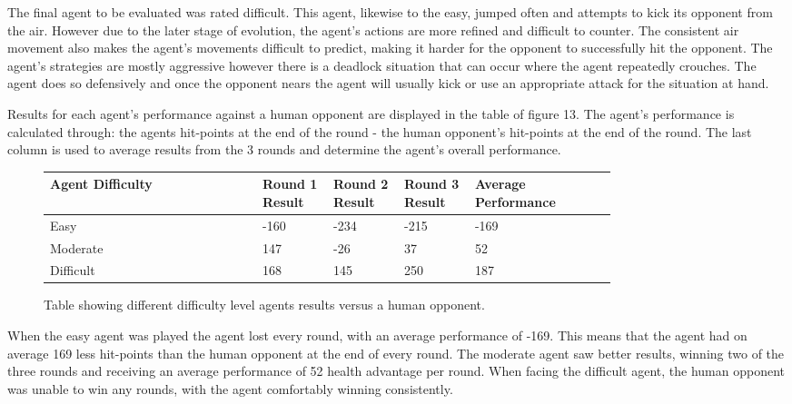 \documentclass[12pt,a4paper]{article}
\begin{document}
The final agent to be evaluated was rated difficult. This agent, likewise to the easy, jumped often and attempts to kick its opponent from the air. However due to the later stage of evolution, the agent's actions are more refined and difficult to counter. The consistent air movement also makes the agent's movements difficult to predict, making it harder for the opponent to successfully hit the opponent. The agent's strategies are mostly aggressive however there is a deadlock situation that can occur where the agent repeatedly crouches. The agent does so defensively and once the opponent nears the agent will usually kick or use an appropriate attack for the situation at hand.

\newpage
Results for each agent's performance against a human opponent are displayed in the table of figure 13. The agent's performance is calculated through: the agents hit-points at the end of the round - the human opponent's hit-points at the end of the round. The last column is used to average results from the 3 rounds and determine the agent's overall performance.\\

\begin{figure}[h]
\begin{tabular}{|p{0.3\linewidth}|p{0.1\linewidth}|p{0.1\linewidth}|p{0.1\linewidth}|p{0.2\linewidth}|}
\hline
Agent Difficulty & Round 1 Result & Round 2 Result & Round 3 Result & Average Performance\\ \hline
Easy & -160 & -234 & -215 & -169\\ \hline
Moderate & 147 & -26 & 37 & 52\\ \hline
Difficult & 168 & 145 & 250 & 187\\ \hline
\end{tabular}
\caption{Table showing different difficulty level agents results versus a human opponent.}
\end{figure}

\vspace{8mm}

When the easy agent was played the agent lost every round, with an average performance of -169. This means that the agent had on average 169 less hit-points than the human opponent at the end of every round. The moderate agent saw better results, winning two of the three rounds and receiving an average performance of 52 health advantage per round. When facing the difficult agent, the human opponent was unable to win any rounds, with the agent comfortably winning consistently.\\
\end{document}
